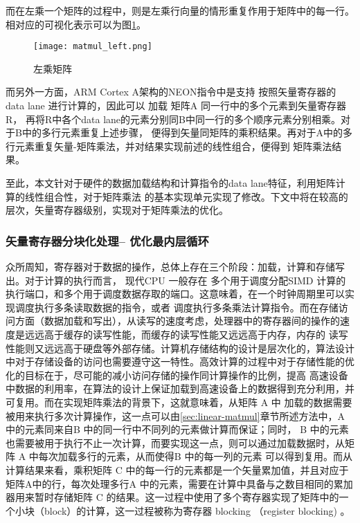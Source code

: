 而在左乘一个矩阵的过程中，则是左乘行向量的情形重复作用于矩阵中的每一行。相对应的可视化表示可以为图\ref{fig:matmul_left}。

\begin{figure}
\centering
  \texttt{[image: matmul\_left.png]}
\caption{左乘矩阵}
\label{fig:matmul_left}
\end{figure}

而另外一方面，ARM Cortex A架构的NEON指令中是支持 按照矢量寄存器的 data lane 进行计算的，因此可以
加载 矩阵A 同一行中的多个元素到矢量寄存器 R，
再将R中各个data lane的元素分别同B中同一行的多个顺序元素分别相乘。对于B中的多行元素重复上述步骤，
便得到矢量同矩阵的乘积结果。再对于A中的多行元素重复矢量-矩阵乘法，并对结果实现前述的线性组合，便得到
矩阵乘法结果。

至此，本文针对于硬件的数据加载结构和计算指令的data lane特征，利用矩阵计算的线性组合性，对于矩阵乘法
的基本实现单元实现了修改。下文中将在较高的层次，矢量寄存器级别，实现对于矩阵乘法的优化。

\subsubsection{矢量寄存器分块化处理-- 优化最内层循环}
\label{sec:register-block}

众所周知，寄存器对于数据的操作，总体上存在三个阶段：加载，计算和存储写出。对于计算的执行而言， 
现代CPU 一般存在
多个用于调度分配SIMD 计算的执行端口，和多个用于调度数据存取的端口。这意味着，在一个时钟周期里可以实现调度执行多条读取数据的指令，或者
调度执行多条乘法计算指令。而在存储访问方面（数据加载和写出），从读写的速度考虑，处理器中的寄存器间的操作的速度是远远高于缓存的读写性能，而缓存的读写性能又远远高于内存，内存的
读写性能则又远远高于硬盘等外部存储。计算机存储结构的设计是层次化的，算法设计中对于存储设备的访问也需要遵守这一特性。高效计算的过程中对于存储性能的优化的目标在于，尽可能的减小访问存储的操作同计算操作的比例，提高
高速设备中数据的利用率，在算法的设计上保证加载到高速设备上的数据得到充分利用，并可复用。而在实现矩阵乘法的背景下，这就意味着，从矩阵 A 中
加载的数据需要被用来执行多次计算操作，这一点可以由\ref{sec:linear-matmul}章节所述方法中，A 中的元素同来自B 中的同一行中不同列的元素做计算而保证；同时，
B 中的元素也需要被用于执行不止一次计算，而要实现这一点，则可以通过加载数据时，从矩阵 A 中每次加载多行的元素，从而使得B 中的每一列的元素
可以得到复用。而从计算结果来看，乘积矩阵 C 中的每一行的元素都是一个矢量累加值，并且对应于矩阵A中的行，每次处理多行A 中的元素，需要在计算中具备与之数目相同的累加器用来暂时存储矩阵 C 的结果。这一过程中使用了多个寄存器实现了矩阵中的一个小块（block）的计算，这一过程被称为寄存器 blocking （register blocking) 。

